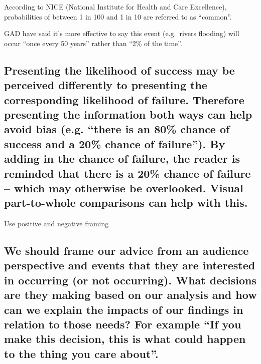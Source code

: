 \documentclass[]{book}
\begin{document}
According to NICE (National Institute for Health and Care Excellence),
probabilities of between 1 in 100 and 1 in 10 are referred to as
``common''.

GAD have said it's more effective to say this event (e.g.~rivers
flooding) will occur ``once every 50 years'' rather than ``2\% of the
time''.

\subsection{\texorpdfstring{Presenting the likelihood of success may be
perceived differently to presenting the corresponding likelihood of
failure. Therefore presenting the information both ways can help avoid
bias (e.g. ``there is an 80\% chance of success and a 20\% chance of
failure''). By adding in the chance of failure, the reader is reminded
that there is a 20\% chance of failure -- which may otherwise be
overlooked. Visual part-to-whole comparisons can help with
this.}{Presenting the likelihood of success may be perceived differently to presenting the corresponding likelihood of failure. Therefore presenting the information both ways can help avoid bias (e.g. there is an 80\% chance of success and a 20\% chance of failure). By adding in the chance of failure, the reader is reminded that there is a 20\% chance of failure -- which may otherwise be overlooked. Visual part-to-whole comparisons can help with this.}}\label{presenting-the-likelihood-of-success-may-be-perceived-differently-to-presenting-the-corresponding-likelihood-of-failure.-therefore-presenting-the-information-both-ways-can-help-avoid-bias-e.g.-there-is-an-80-chance-of-success-and-a-20-chance-of-failure.-by-adding-in-the-chance-of-failure-the-reader-is-reminded-that-there-is-a-20-chance-of-failure-which-may-otherwise-be-overlooked.-visual-part-to-whole-comparisons-can-help-with-this.}

 Use positive and negative framing

\subsection{\texorpdfstring{We should frame our advice from an audience
perspective and events that they are interested in occurring (or not
occurring). What decisions are they making based on our analysis and how
can we explain the impacts of our findings in relation to those needs?
For example ``If you make this decision, this is what could happen to
the thing you care
about''.}{We should frame our advice from an audience perspective and events that they are interested in occurring (or not occurring). What decisions are they making based on our analysis and how can we explain the impacts of our findings in relation to those needs? For example If you make this decision, this is what could happen to the thing you care about.}}\label{we-should-frame-our-advice-from-an-audience-perspective-and-events-that-they-are-interested-in-occurring-or-not-occurring.-what-decisions-are-they-making-based-on-our-analysis-and-how-can-we-explain-the-impacts-of-our-findings-in-relation-to-those-needs-for-example-if-you-make-this-decision-this-is-what-could-happen-to-the-thing-you-care-about.}
\end{document}
